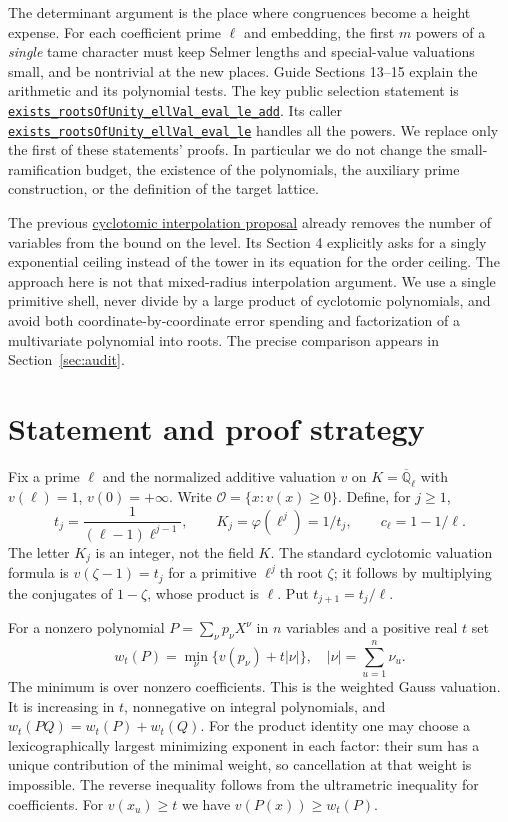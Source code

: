 \documentclass[11pt]{article}
\newcommand{\Ocal}{\mathcal O}\newcommand{\Qp}{\overline{\mathbb Q}_{\ell}}
\newcommand{\src}[3]{\href{https://github.com/VladimirReshetnikov/ProveIt/blob/ef7d441dcb37ea944b7ac15731bb766f2e1354ea/Analysis/GeneralizedRiemannHypothesis/Lean/grh/src/#1.lean\#L#2}{#3}}
\newcommand{\propbase}{https://github.com/VladimirReshetnikov/ProveIt/tree/ef7d441dcb37ea944b7ac15731bb766f2e1354ea/Analysis/GeneralizedRiemannHypothesis/docs/proposals}
\begin{document}
The determinant argument is the place where congruences become a height expense. For each coefficient prime $\ell$ and embedding, the first $m$ powers of a \emph{single} tame character must keep Selmer lengths and special-value valuations small, and be nontrivial at the new places. Guide Sections 13--15 explain the arithmetic and its polynomial tests. The key public selection statement is \src{New/Congruences/Selmer/RootsOfUnity}{474}{\texttt{exists\_rootsOfUnity\_ellVal\_eval\_le\_add}}. Its caller \src{New/Congruences/Selmer/GeneralTheorem}{325}{\texttt{exists\_rootsOfUnity\_ellVal\_eval\_le}} handles all the powers. We replace only the first of these statements' proofs. In particular we do not change the small-ramification budget, the existence of the polynomials, the auxiliary prime construction, or the definition of the target lattice.

The previous \href{\propbase/cyclotomic-interpolation-and-theta-lifts}{cyclotomic interpolation proposal} already removes the number of variables from the bound on the level. Its Section 4 explicitly asks for a singly exponential ceiling instead of the tower in its equation for the order ceiling. The approach here is not that mixed-radius interpolation argument. We use a single primitive shell, never divide by a large product of cyclotomic polynomials, and avoid both coordinate-by-coordinate error spending and factorization of a multivariate polynomial into roots. The precise comparison appears in Section~\ref{sec:audit}.
\section{Statement and proof strategy}\label{sec:statement}
Fix a prime $\ell$ and the normalized additive valuation $v$ on $K=\Qp$ with $v(\ell)=1$, $v(0)=+\infty$. Write $\Ocal=\{x:v(x)\ge0\}$. Define, for $j\ge1$,
\[
 t_j=\frac{1}{(\ell-1)\ell^{j-1}},\qquad K_j=\varphi(\ell^j)=1/t_j,\qquad c_\ell=1-1/\ell.
\]
The letter $K_j$ is an integer, not the field $K$. The standard cyclotomic valuation formula is $v(\zeta-1)=t_j$ for a primitive $\ell^j$th root $\zeta$; it follows by multiplying the conjugates of $1-\zeta$, whose product is $\ell$. Put $t_{j+1}=t_j/\ell$.

For a nonzero polynomial $P=\sum_\nu p_\nu X^\nu$ in $n$ variables and a positive real $t$ set
\[
 w_t(P)=\min_\nu\{v(p_\nu)+t|\nu|\},\quad |\nu|=\sum_{u=1}^n\nu_u.
\]
The minimum is over nonzero coefficients. This is the weighted Gauss valuation. It is increasing in $t$, nonnegative on integral polynomials, and $w_t(PQ)=w_t(P)+w_t(Q)$. For the product identity one may choose a lexicographically largest minimizing exponent in each factor: their sum has a unique contribution of the minimal weight, so cancellation at that weight is impossible. The reverse inequality follows from the ultrametric inequality for coefficients. For $v(x_u)\ge t$ we have $v(P(x))\ge w_t(P)$.
\end{document}
